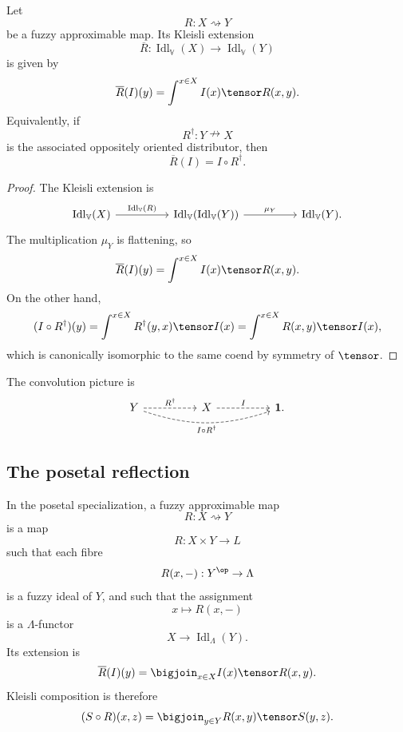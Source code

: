 \begin{proposition}
\label{prop:kleisli-extension-convolution}
Let
\[
    R:X\rightsquigarrow Y
\]
be a fuzzy approximable map. Its Kleisli extension
\[
    \overline R:
    \operatorname{Idl}_{\mathbb V}(X)
    \to
    \operatorname{Idl}_{\mathbb V}(Y)
\]
is given by
\[
    \overline R(I)(y)
    =
    \int^{x\in X}
    I(x)\tensor R(x,y).
\]
Equivalently, if
\[
    R^\dagger:Y\nrightarrow X
\]
is the associated oppositely oriented distributor, then
\[
    \overline R(I)
    =
    I\circ R^\dagger.
\]
\end{proposition}

\begin{proof}
The Kleisli extension is
\[
\begin{tikzcd}[column sep=huge,row sep=large]
\operatorname{Idl}_{\mathbb V}(X)
    \ar[r,"\operatorname{Idl}_{\mathbb V}(R)"]
&
\operatorname{Idl}_{\mathbb V}
    (\operatorname{Idl}_{\mathbb V}(Y))
    \ar[r,"\mu_Y"]
&
\operatorname{Idl}_{\mathbb V}(Y).
\end{tikzcd}
\]
The multiplication \(\mu_Y\) is flattening, so
\[
    \overline R(I)(y)
    =
    \int^{x\in X}
    I(x)\tensor R(x,y).
\]
On the other hand,
\[
    (I\circ R^\dagger)(y)
    =
    \int^{x\in X}
    R^\dagger(y,x)\tensor I(x)
    =
    \int^{x\in X}
    R(x,y)\tensor I(x),
\]
which is canonically isomorphic to the same coend by symmetry of \(\tensor\).
\end{proof}

The convolution picture is
\[
\begin{tikzcd}[column sep=huge,row sep=large]
Y
    \ar[r,dashed,"R^\dagger"]
    \ar[rr,bend right=18,dashed,"I\circ R^\dagger"']
&
X
    \ar[r,dashed,"I"]
&
\mathbf 1.
\end{tikzcd}
\]

\subsection{The posetal reflection}
\label{subsec:ideals-as-distributors-posetal}

In the posetal specialization, a fuzzy approximable map
\[
    R:X\rightsquigarrow Y
\]
is a map
\[
    R:X\times Y\to L
\]
such that each fibre
\[
    R(x,-):Y^{\op}\to \Lambda
\]
is a fuzzy ideal of \(Y\), and such that the assignment
\[
    x\longmapsto R(x,-)
\]
is a \(\Lambda\)-functor
\[
    X\to \operatorname{Idl}_\Lambda(Y).
\]
Its extension is
\[
    \overline R(I)(y)
    =
    \bigjoin_{x\in X}
    I(x)\tensor R(x,y).
\]
Kleisli composition is therefore
\[
    (S\circ R)(x,z)
    =
    \bigjoin_{y\in Y}
    R(x,y)\tensor S(y,z).
\]

